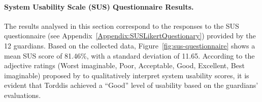                 \paragraph{System Usability Scale (SUS) Questionnaire Results.}
                The results analysed in this section correspond to the responses to the SUS questionnaire (see Appendix~\ref{Appendix:SUSLikertQuestionary}) provided by the 12 guardians. Based on the collected data, Figure~\ref{fig:sus-questionnaire} shows a mean SUS score of 81.46\%, with a standard deviation of 11.65. According to the adjective ratings (Worst imaginable, Poor, Acceptable, Good, Excellent, Best imaginable) proposed by \cite{Bangor2008AnEmpirical} to qualitatively interpret system usability scores, it is evident that Torddis achieved a “Good” level of usability based on the guardians’ evaluations.
                
